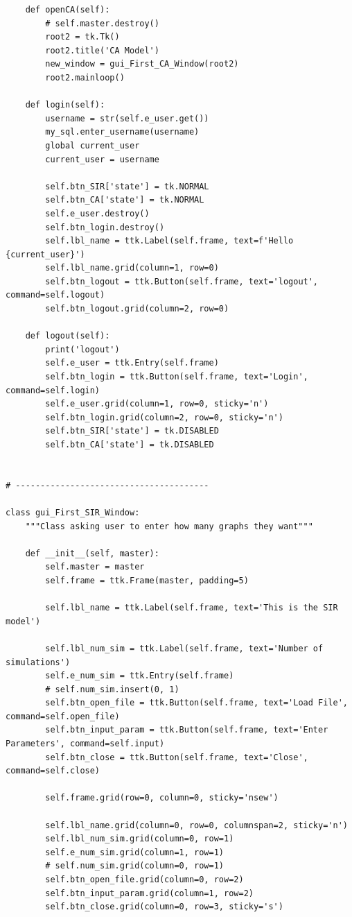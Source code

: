 \documentclass[11pt, a4paper]{article}
\begin{document}
\begin{lstlisting}
    def openCA(self):
        # self.master.destroy()
        root2 = tk.Tk()
        root2.title('CA Model')
        new_window = gui_First_CA_Window(root2)
        root2.mainloop()

    def login(self):
        username = str(self.e_user.get())
        my_sql.enter_username(username)
        global current_user
        current_user = username

        self.btn_SIR['state'] = tk.NORMAL
        self.btn_CA['state'] = tk.NORMAL
        self.e_user.destroy()
        self.btn_login.destroy()
        self.lbl_name = ttk.Label(self.frame, text=f'Hello {current_user}')
        self.lbl_name.grid(column=1, row=0)
        self.btn_logout = ttk.Button(self.frame, text='logout', command=self.logout)
        self.btn_logout.grid(column=2, row=0)

    def logout(self):
        print('logout')
        self.e_user = ttk.Entry(self.frame)
        self.btn_login = ttk.Button(self.frame, text='Login', command=self.login)
        self.e_user.grid(column=1, row=0, sticky='n')
        self.btn_login.grid(column=2, row=0, sticky='n')
        self.btn_SIR['state'] = tk.DISABLED
        self.btn_CA['state'] = tk.DISABLED


# ---------------------------------------

class gui_First_SIR_Window:
    """Class asking user to enter how many graphs they want"""

    def __init__(self, master):
        self.master = master
        self.frame = ttk.Frame(master, padding=5)

        self.lbl_name = ttk.Label(self.frame, text='This is the SIR model')

        self.lbl_num_sim = ttk.Label(self.frame, text='Number of simulations')
        self.e_num_sim = ttk.Entry(self.frame)
        # self.num_sim.insert(0, 1)
        self.btn_open_file = ttk.Button(self.frame, text='Load File', command=self.open_file)
        self.btn_input_param = ttk.Button(self.frame, text='Enter Parameters', command=self.input)
        self.btn_close = ttk.Button(self.frame, text='Close', command=self.close)

        self.frame.grid(row=0, column=0, sticky='nsew')

        self.lbl_name.grid(column=0, row=0, columnspan=2, sticky='n')
        self.lbl_num_sim.grid(column=0, row=1)
        self.e_num_sim.grid(column=1, row=1)
        # self.num_sim.grid(column=0, row=1)
        self.btn_open_file.grid(column=0, row=2)
        self.btn_input_param.grid(column=1, row=2)
        self.btn_close.grid(column=0, row=3, sticky='s')


\end{lstlisting}
\end{document}
